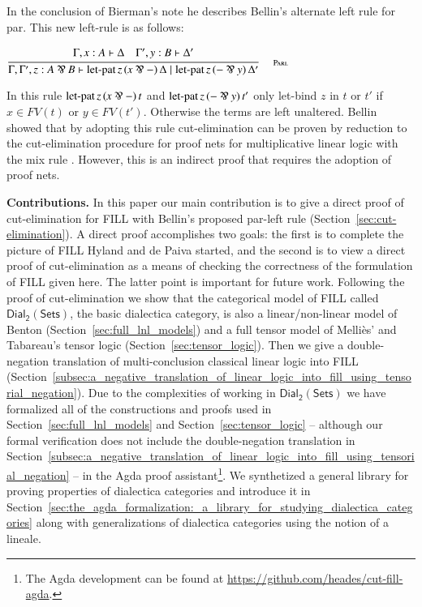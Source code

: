 \documentclass{elsarticle}
\newcommand{\dial}[0]{\mathsf{Dial_2}(\mathsf{Sets})}
\begin{document}
In the conclusion of Bierman's note he describes Bellin's  alternate left rule
for par.  This new left-rule is as follows:
\begin{center}
  \begin{math}
    \FILLdruleParl{}
  \end{math}
\end{center}
In this rule $ \mathsf{\operatorname{let-pat} }\, \FILLmv{z} \, \FILLsym{(}   \FILLmv{x}  \parr   -    \FILLsym{)} \, \FILLnt{t} $ and $ \mathsf{\operatorname{let-pat} }\, \FILLmv{z} \, \FILLsym{(}    -   \parr  \FILLmv{y}   \FILLsym{)} \, \FILLnt{t'} $ only let-bind $z$ in $t$ or $t'$ if $x \in FV(t)$ or $y \in
FV(t')$.  Otherwise the terms are left unaltered.  Bellin showed that
by adopting this rule cut-elimination can be proven by reduction to
the cut-elimination procedure for proof nets for multiplicative linear
logic with the mix rule \cite{Bellin:1997}.  However, this is an
indirect proof that requires the adoption of proof nets.

\textbf{Contributions.} In this paper our main contribution is to give
a direct proof of cut-elimination for FILL with Bellin's proposed
par-left rule (Section~\ref{sec:cut-elimination}).  A direct proof
accomplishes two goals: the first is to complete the picture of FILL
Hyland and de Paiva started, and the second is to view a direct proof
of cut-elimination as a means of checking the correctness of the
formulation of FILL given here.  The latter point is important for
future work.  Following the proof of cut-elimination we show that the
categorical model of FILL called $\dial$, the basic dialectica
category, is also a linear/non-linear model of Benton
(Section~\ref{sec:full_lnl_models}) and a full tensor model of
Melli\`es' and Tabareau's tensor logic
(Section~\ref{sec:tensor_logic}). Then we give a double-negation
translation of multi-conclusion classical linear logic into FILL
(Section~\ref{subsec:a_negative_translation_of_linear_logic_into_fill_using_tensorial_negation}).
Due to the complexities of working in $\dial$ we have formalized all
of the constructions and proofs used in
Section~\ref{sec:full_lnl_models} and Section~\ref{sec:tensor_logic}
-- although our formal verification does not include the
double-negation translation in
Section~\ref{subsec:a_negative_translation_of_linear_logic_into_fill_using_tensorial_negation}
-- in the Agda proof assistant\footnote{The Agda development can be
  found at \url{https://github.com/heades/cut-fill-agda}.}.  We
synthetized
a general library for proving properties of dialectica
categories and introduce it in
Section~\ref{sec:the_agda_formalization:_a_library_for_studying_dialectica_categories}
along with generalizations of dialectica categories using the notion
of a lineale.
\end{document}
